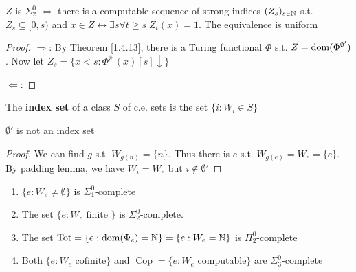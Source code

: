 \documentclass[11pt]{article}
\DeclareMathOperator{\Cop}{Cop}
\begin{document}
\begin{proposition}[]
\(Z\) is \(\Sigma_2^0\) \(\Leftrightarrow\) there is a computable sequence of strong indices \((Z_s)_{s\in\mathbb{N}}\)
s.t. \(Z_s\subseteq[0,s)\) and \(x\in Z\leftrightarrow\exists s\forall t\ge s\;Z_t(x)=1\). The equivalence is uniform
\end{proposition}

\begin{proof}
\(\Rightarrow\): By Theorem \ref{1.4.13}, there is a Turing functional \(\Phi\) s.t. \(Z=\operatorname{dom}(\Phi^{\emptyset'})\). Now
let \(Z_s=\{x<s:\Phi^{\emptyset'}(x)[s]\downarrow\}\)

\(\Leftarrow\):
\end{proof}

\begin{definition}[]
The \textbf{index set} of a class \(S\) of c.e. sets is the set \(\{i:W_i\in S\}\)
\end{definition}


\begin{exercise}
\label{1.4.19}
\(\emptyset'\) is not an index set
\end{exercise}

\begin{proof}
We can find \(g\) s.t. \(W_{g(n)}=\{n\}\). Thus there is \(e\) s.t. \(W_{g(e)}=W_e=\{e\}\). By
padding lemma, we have \(W_i=W_e\) but \(i\notin\emptyset'\)
\end{proof}

\begin{exercise}
\begin{enumerate}
\item \(\{e:W_e\neq\emptyset\}\) is \(\Sigma_1^0\)-complete
\item The set \(\{e:W_e\text{ finite }\}\) is \(\Sigma_2^0\)-complete.
\item The set \(\operatorname{Tot}=\{e:\operatorname{dom}(\Phi_e)=\mathbb{N}\}=\{e:W_e=\mathbb{N}\}\) is \(\Pi_2^0\)-complete
\item Both \(\{e:W_e\text{ cofinite}\}\) and \(\Cop=\{e:W_e\text{ computable}\}\) are \(\Sigma_3^0\)-complete
\end{enumerate}
\end{exercise}
\end{document}

